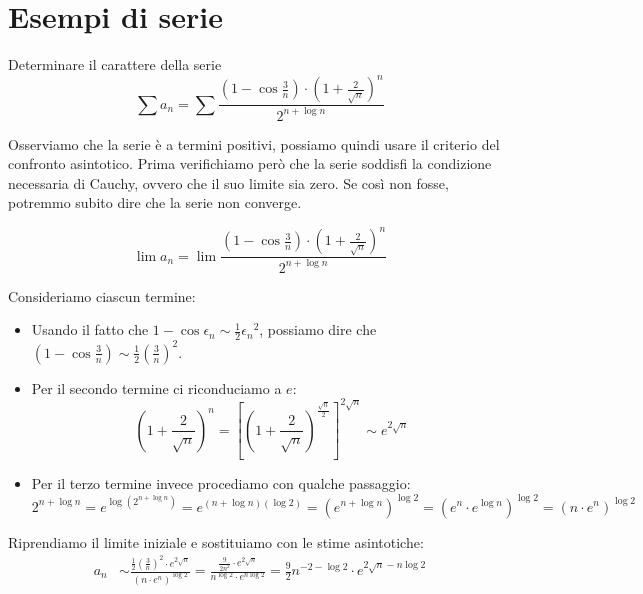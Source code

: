 \section{Esempi di serie}

\begin{example}
Determinare il carattere della serie
\begin{equation*}
\sum a_n = \sum \frac{\left(1 - \cos \frac{3}{n}\right)\cdot \left(1 + \frac{2}{\sqrt{n}} \right)^n}{2^{n+\log n}}
\end{equation*}

Osserviamo che la serie è a termini positivi, possiamo quindi usare il criterio del confronto asintotico. Prima verifichiamo però che la serie soddisfi la condizione necessaria di Cauchy, ovvero che il suo limite sia zero. Se così non fosse, potremmo subito dire che la serie non converge.

\begin{equation*}
\lim a_n = \lim \frac{\left(1 - \cos \frac{3}{n}\right)\cdot \left(1 + \frac{2}{\sqrt{n}} \right)^n}{2^{n+\log n}}
\end{equation*}

Consideriamo ciascun termine:
\begin{itemize}
\item Usando il fatto che $1 - \cos \epsilon_n \sim \frac{1}{2} {\epsilon_n}^2$, possiamo dire che $(1-\cos \frac{3}{n}) \sim \frac{1}{2} (\frac{3}{n})^2$.
\item Per il secondo termine ci riconduciamo a $e$:
\begin{equation*}
\left(1 + \frac{2}{\sqrt{n}} \right)^n = \left[\left(1 + \frac{2}{\sqrt{n}} \right)^{\frac{\sqrt{n}}{2}} \right]^{2\sqrt{n}} \sim e^{2 \sqrt{n}}
\end{equation*}
\item Per il terzo termine invece procediamo con qualche passaggio:
\begin{equation*}
2^{n+\log n} = e^{\log(2^{n+\log n})} = e^{(n+\log n)(\log 2)} = (e^{n+\log n})^{\log 2} = (e^n \cdot e^{\log n})^{\log 2} = (n \cdot e^n)^{\log 2}
\end{equation*}
\end{itemize}

Riprendiamo il limite iniziale e sostituiamo con le stime asintotiche:
\begin{align*}
a_n &\sim \frac{\frac{1}{2}\left(\frac{3}{n} \right)^2 \cdot e^{2\sqrt{n}}}{(n \cdot e^n)^{\log 2}} = \frac{\frac{9}{2n^2} \cdot e^{2\sqrt{n}}}{n^{\log 2} \cdot e^{n \log 2}} = \frac{9}{2}n^{-2 - \log 2} \cdot e^{2\sqrt{n} - n\log 2}
\end{align*}


\end{example}

